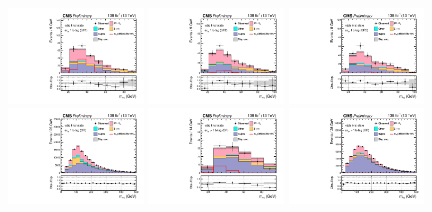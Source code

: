 \begin{figure}[ht]
    \begin{center}
        \includegraphics[width=0.32\textwidth]{figures/ch-13-results/et_all_1_post_prelim-yes.pdf}
        \includegraphics[width=0.32\textwidth]{figures/ch-13-results/et_all_2_post_prelim-yes.pdf}
        \includegraphics[width=0.32\textwidth]{figures/ch-13-results/et_all_3_post_prelim-yes.pdf}\\
        \includegraphics[width=0.32\textwidth]{figures/ch-13-results/et_all_4_post_prelim-yes.pdf}
        \includegraphics[width=0.32\textwidth]{figures/ch-13-results/et_all_5_post_prelim-yes.pdf}
        \includegraphics[width=0.32\textwidth]{figures/ch-13-results/et_all_6_post_prelim-yes.pdf}

\end{center}
\end{figure}
